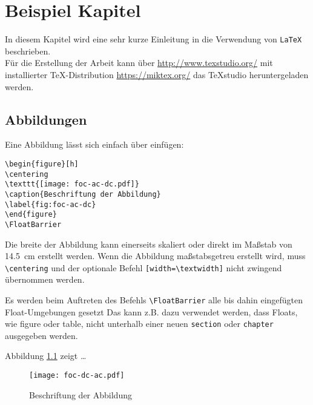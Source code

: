 
\chapter{Beispiel Kapitel}
\label{chap:beispiel-kapitel}

In diesem Kapitel wird eine sehr kurze Einleitung in die Verwendung von \verb|LaTeX| beschrieben.\\
Für die Erstellung der Arbeit kann über \url{http://www.texstudio.org/} mit installierter TeX-Distribution \url{https://miktex.org/} das TeXstudio heruntergeladen werden. 

\section{Abbildungen}
Eine Abbildung lässt sich einfach über einfügen: \par\medskip

\lstset{language=TeX}
\begin{lstlisting}
\begin{figure}[h]
\centering
\texttt{[image: foc-ac-dc.pdf]}
\caption{Beschriftung der Abbildung}
\label{fig:foc-ac-dc}
\end{figure}
\FloatBarrier
\end{lstlisting}

Die breite der Abbildung kann einerseits skaliert oder direkt im Maßstab von \SI{14.5}{\centi\meter} erstellt werden.
Wenn die Abbildung maßstabsgetreu erstellt wird, muss \verb|\centering| und der optionale Befehl \verb|[width=\textwidth]| nicht zwingend übernommen werden.\par\medskip

Es werden beim Auftreten des Befehls \verb|\FloatBarrier| alle bis dahin eingefügten Float-Umgebungen gesetzt Das kann z.B. dazu verwendet werden, dass Floats, wie figure oder table, nicht unterhalb einer neuen \verb|section| oder \verb|chapter| ausgegeben werden.\par\medskip

Abbildung \ref{fig:foc-dc-ac} zeigt \ldots \par\medskip

\begin{figure}[h]
	\centering
	\texttt{[image: foc-dc-ac.pdf]}
	\caption{Beschriftung der Abbildung}
	\label{fig:foc-dc-ac}
\end{figure}
\FloatBarrier

